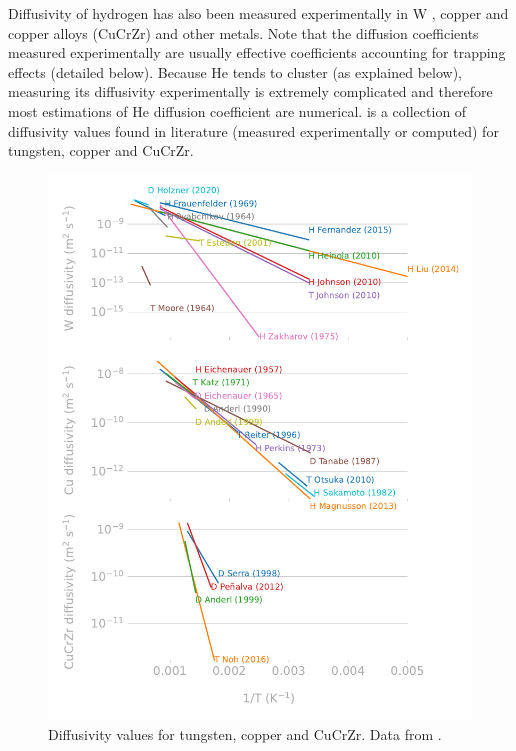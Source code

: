 Diffusivity of hydrogen has also been measured experimentally in W , copper and copper alloys (CuCrZr)  and other metals.
Note that the diffusion coefficients measured experimentally are usually effective coefficients accounting for trapping effects (detailed below).
Because He tends to cluster (as explained below), measuring its diffusivity experimentally is extremely complicated and therefore most estimations of He diffusion coefficient are numerical.
 is a collection of diffusivity values found in literature (measured experimentally or computed) for tungsten, copper and CuCrZr.


\begin{figure}
    \centering
    \includegraphics[width=0.75\linewidth]{Figures/Chapter1/materials_diffusivity_review_comparison.pdf}
    \caption{Diffusivity values for tungsten, copper and CuCrZr. Data from \cite{delaporte-mathurin_remdelaportemathurinh-transport-materials_2022}.}
\end{figure}

